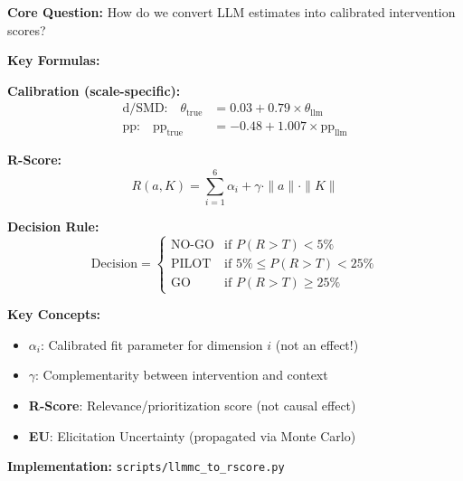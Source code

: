 \begin{tcolorbox}[colback=blue!5!white, colframe=blue!75!black,
    title=Quick Reference: LLMMC Pipeline]

\textbf{Core Question:} How do we convert LLM estimates into calibrated intervention scores?

\textbf{Key Formulas:}

\textbf{Calibration (scale-specific):}
\begin{align}
\text{d/SMD:} \quad \theta_{\text{true}} &= 0.03 + 0.79 \times \theta_{\text{llm}} \label{eq:cal-d} \\
\text{pp:} \quad \text{pp}_{\text{true}} &= -0.48 + 1.007 \times \text{pp}_{\text{llm}} \label{eq:cal-pp}
\end{align}

\textbf{R-Score:}
\begin{equation}
R(a,K) = \sum_{i=1}^{6} \alpha_i + \gamma \cdot \|a\| \cdot \|K\|
\label{eq:rscore}
\end{equation}

\textbf{Decision Rule:}
\begin{equation}
\text{Decision} = \begin{cases}
\text{NO-GO} & \text{if } P(R > T) < 5\% \\
\text{PILOT} & \text{if } 5\% \leq P(R > T) < 25\% \\
\text{GO} & \text{if } P(R > T) \geq 25\%
\end{cases}
\label{eq:decision}
\end{equation}

\textbf{Key Concepts:}
\begin{itemize}[nosep]
\item \textbf{$\alpha_i$}: Calibrated fit parameter for dimension $i$ (not an effect!)
\item \textbf{$\gamma$}: Complementarity between intervention and context
\item \textbf{R-Score}: Relevance/prioritization score (not causal effect)
\item \textbf{EU}: Elicitation Uncertainty (propagated via Monte Carlo)
\end{itemize}

\textbf{Implementation:} \texttt{scripts/llmmc\_to\_rscore.py}

\end{tcolorbox}


